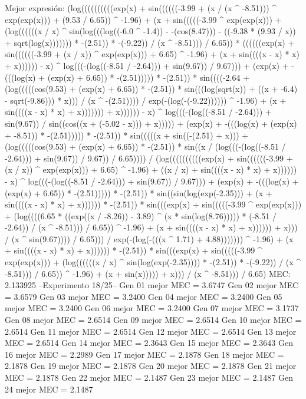 Mejor expresión: (log((((((((((exp(x) + sin((((((-3.99 + (x / (x ^ -8.51))) ^ exp(exp(x))) + (9.53 / 6.65)) ^ -1.96) + (x + sin(((((-3.99 ^ exp(exp(x))) + (log((((((x / x) ^ sin(log(((log((-6.0 ^ -1.4)) - -(cos(8.47))) - ((-9.38 * (9.93 / x)) + sqrt(log(x))))))) * -(2.51)) * -(-9.22)) / (x ^ -8.51))) / 6.65)) * ((((((exp(x) + sin((((((-3.99 + (x / x)) ^ exp(exp(x))) + 6.65) ^ -1.96) + (x + sin((((x - x) * x) + x)))))) - x) ^ log(((-(log((-8.51 / -2.64))) + sin(9.67)) / 9.67))) + (exp(x) + -(((log(x) + (exp(x) + 6.65)) * -(2.51))))) * -(2.51)) * sin((((-2.64 + (log(((((cos(9.53) + (exp(x) + 6.65)) * -(2.51)) * sin(((log(sqrt(x)) + ((x + -6.4) - sqrt(-9.86))) * x))) / (x ^ -(2.51)))) / exp(-(log(-(-9.22)))))) ^ -1.96) + (x + sin((((x - x) * x) + x))))))) + x)))))) - x) ^ log(((-(log((-8.51 / -2.64))) + sin(9.67)) / sin((cos((x + (-5.02 - x))) + x))))) + (exp(x) + -(((log(x) + (exp(x) + -8.51)) * -(2.51))))) * -(2.51)) * sin(((((x + sin((-(2.51) + x))) + (log(((((cos(9.53) + (exp(x) + 6.65)) * -(2.51)) * sin((x / (log(((-(log((-8.51 / -2.64))) + sin(9.67)) / 9.67)) / 6.65)))) / (log((((((((((exp(x) + sin((((((-3.99 + (x / x)) ^ exp(exp(x))) + 6.65) ^ -1.96) + ((x / x) + sin((((x - x) * x) + x)))))) - x) ^ log(((-(log((-8.51 / -2.64))) + sin(9.67)) / 9.67))) + (exp(x) + -(((log(x) + (exp(x) + 6.65)) * -(2.51))))) * -(2.51)) * sin((sin(log(exp(-2.35))) + (x + sin((((x - x) * x) + x)))))) * -(2.51)) * sin(((exp(x) + sin(((((-3.99 ^ exp(exp(x))) + (log((((6.65 * ((exp((x / -8.26)) - 3.89) ^ (x * sin(log(8.76))))) * (-8.51 / -2.64)) / (x ^ -8.51))) / 6.65)) ^ -1.96) + (x + sin((((x - x) * x) + x)))))) + x))) / (x ^ sin(9.67)))) / 6.65))) / exp(-(log(-(((x ^ 1.71) + 4.88))))))) ^ -1.96) + (x + sin((((x - x) * x) + x)))))) * -(2.51)) * sin(((exp(x) + sin(((((-3.99 ^ exp(exp(x))) + (log((((((x / x) ^ sin(log(exp(-2.35)))) * -(2.51)) * -(-9.22)) / (x ^ -8.51))) / 6.65)) ^ -1.96) + (x + sin(x))))) + x))) / (x ^ -8.51))) / 6.65)
MEC: 2.133925
--Experimento 
 18/25--
Gen 01 mejor MEC = 3.6747
Gen 02 mejor MEC = 3.6579
Gen 03 mejor MEC = 3.2400
Gen 04 mejor MEC = 3.2400
Gen 05 mejor MEC = 3.2400
Gen 06 mejor MEC = 3.2400
Gen 07 mejor MEC = 3.1737
Gen 08 mejor MEC = 2.6514
Gen 09 mejor MEC = 2.6514
Gen 10 mejor MEC = 2.6514
Gen 11 mejor MEC = 2.6514
Gen 12 mejor MEC = 2.6514
Gen 13 mejor MEC = 2.6514
Gen 14 mejor MEC = 2.3643
Gen 15 mejor MEC = 2.3643
Gen 16 mejor MEC = 2.2989
Gen 17 mejor MEC = 2.1878
Gen 18 mejor MEC = 2.1878
Gen 19 mejor MEC = 2.1878
Gen 20 mejor MEC = 2.1878
Gen 21 mejor MEC = 2.1878
Gen 22 mejor MEC = 2.1487
Gen 23 mejor MEC = 2.1487
Gen 24 mejor MEC = 2.1487
